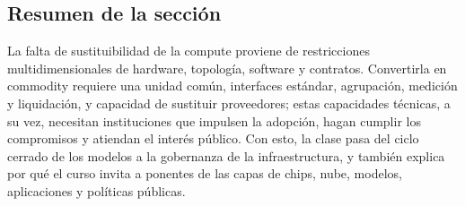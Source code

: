 \subsection{Resumen de la sección}

La falta de sustituibilidad de la compute proviene de restricciones multidimensionales de hardware, topología, software y contratos. Convertirla en commodity requiere una unidad común, interfaces estándar, agrupación, medición y liquidación, y capacidad de sustituir proveedores; estas capacidades técnicas, a su vez, necesitan instituciones que impulsen la adopción, hagan cumplir los compromisos y atiendan el interés público. Con esto, la clase pasa del ciclo cerrado de los modelos a la gobernanza de la infraestructura, y también explica por qué el curso invita a ponentes de las capas de chips, nube, modelos, aplicaciones y políticas públicas.
